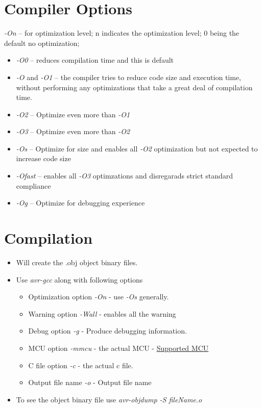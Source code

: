 \section{Compiler Options\texorpdfstring{\cite{compilerOptimize}}{}} \label{optimization}
\emph{-On} -- for optimization level; n indicates the optimization level; 0 being the default no optimization; 
\begin{itemize}
    \item \emph{-O0} -- reduces compilation time and this is default
    \item \emph{-O} and \emph{-O1} -- the compiler tries to reduce code size and execution time, without performing any optimizations that take a great deal of compilation time.
    \item \emph{-O2} --  Optimize even more than \emph{-O1}
    \item \emph{-O3} --  Optimize even more than \emph{-O2}
    \item \emph{-Os} -- Optimize for size and enables all \emph{-O2} optimization but not expected to increase code size
    \item \emph{-Ofast} -- enables all \emph{-O3} optimzations and disregarads strict standard compliance
    \item \emph{-Og} -- Optimize for debugging experience
\end{itemize}


\section{Compilation} 
\begin{itemize}
    \item Will create the .obj object binary files.
    \item Use \emph{avr-gcc} along with following options
    \begin{itemize}
        \item Optimization option \emph{-On} - use \emph{-Os} generally.
        \item Warning option \emph{-Wall} - enables all the warning
        \item Debug option \emph{-g} - Produce debugging information.
        \item MCU option \emph{-mmcu} - the actual MCU - \href{https://www.nongnu.org/avr-libc/user-manual/#supp_devices}{Supported MCU}
        \item C file option \emph{-c} - the actual c file.
        \item Output file name \emph{-o} - Output file name
    \end{itemize}
    \item To see the object binary file use \emph{avr-objdump -S fileName.o}
\end{itemize}


